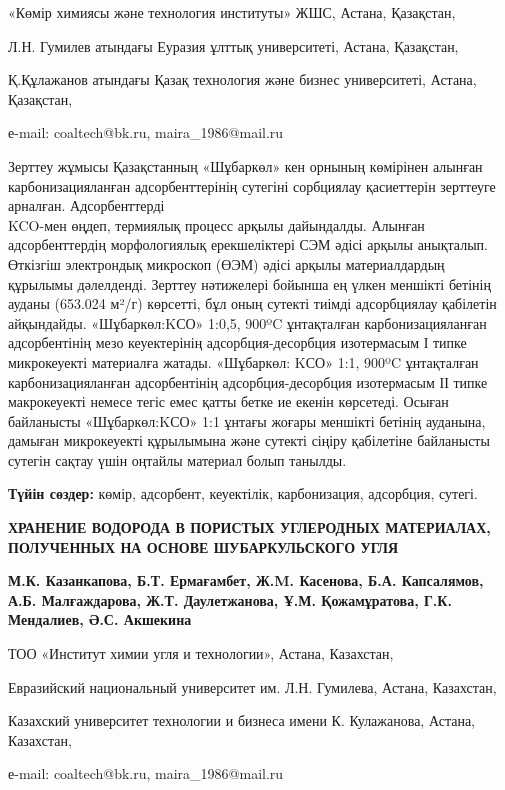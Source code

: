 \begin{affil}
«Көмір химиясы және технология институты» ЖШС, Астана, Қазақстан,

Л.Н. Гумилев атындағы Еуразия ұлттық университеті, Астана, Қазақстан,

Қ.Құлажанов атындағы Қазақ технология және бизнес университеті, Астана, Қазақстан,

е-mail: coaltech@bk.ru, maira\_1986@mail.ru
\end{affil}

Зерттеу жұмысы Қазақстанның «Шұбаркөл» кен орнының көмірінен алынған
карбонизацияланған адсорбенттерінің сутегіні сорбциялау қасиеттерін
зерттеуге арналған. Адсорбенттерді\\
KCO-мен өңдеп, термиялық процесс
арқылы дайындалды. Алынған адсорбенттердің морфологиялық ерекшеліктері
СЭМ әдісі арқылы анықталып. Өткізгіш электрондық микроскоп (ӨЭМ) әдісі
арқылы материалдардың құрылымы дәлелденді. Зерттеу нәтижелері бойынша ең
үлкен меншікті бетінің ауданы (653.024 м²/г) көрсетті, бұл оның сутекті
тиімді адсорбциялау қабілетін айқындайды.
«Шұбаркөл:KСО» 1:0,5, 900ºC
ұнтақталған карбонизацияланған адсорбентінің мезо кеуектерінің
адсорбция-десорбция изотермасым І типке микрокеуекті материалға жатады.
«Шұбаркөл: KСО» 1:1, 900ºC ұнтақталған
карбонизацияланған адсорбентінің адсорбция-десорбция изотермасым ІІ
типке макрокеуекті немесе тегіс емес қатты бетке ие екенін көрсетеді.
Осыған байланысты «Шұбаркөл:KСО» 1:1
ұнтағы жоғары меншікті бетінің ауданына, дамыған микрокеуекті құрылымына
және сутекті сіңіру қабілетіне байланысты сутегін сақтау үшін оңтайлы
материал болып танылды.

{\bfseries Түйін сөздер:} көмір, адсорбент, кеуектілік, карбонизация,
адсорбция, сутегі.

\begin{header}
{\bfseries ХРАНЕНИЕ ВОДОРОДА В ПОРИСТЫХ УГЛЕРОДНЫХ МАТЕРИАЛАХ, ПОЛУЧЕННЫХ НА ОСНОВЕ ШУБАРКУЛЬСКОГО УГЛЯ} 

{\bfseries
{}М.К. Казанкапова,
Б.Т. Ермағамбет,
Ж.M. Касенова,
Б.А. Капсалямов, 
А.Б. Малғаждарова,
Ж.Т. Даулетжанова,
Ұ.М. Қожамұратова, 
Г.К. Мендалиев,
Ә.С. Акшекина
}
\end{header}

\begin{affil}
ТОО «Институт химии угля и технологии», Астана, Казахстан,

Евразийский национальный университет им. Л.Н. Гумилева, Астана, Казахстан,

Казахский университет технологии и бизнеса имени К. Кулажанова, Астана, Казахстан,

е-mail: coaltech@bk.ru, maira\_1986@mail.ru
\end{affil}

